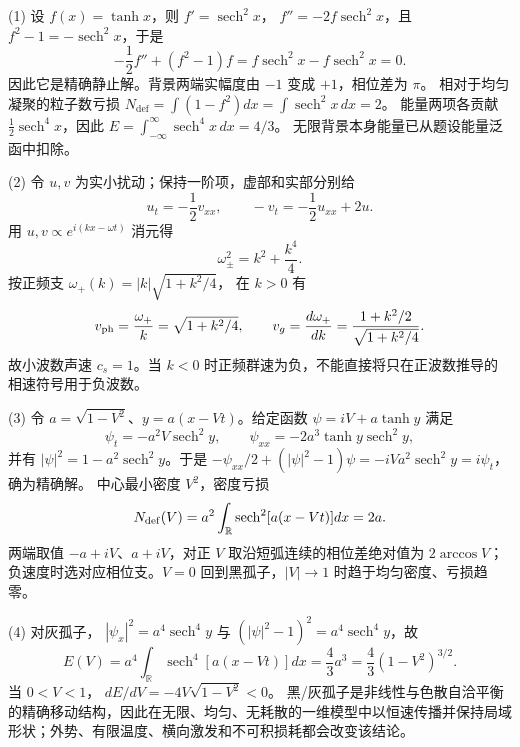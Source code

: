 (1) 设 \(f(x)=\tanh x\)，则
\(f'=\operatorname{sech}^2x\)，
\(f''=-2f\operatorname{sech}^2x\)，且 \(f^2-1=-\operatorname{sech}^2x\)，于是
\[
-\frac12f''+(f^2-1)f
=f\operatorname{sech}^2x-f\operatorname{sech}^2x=0.
\]
因此它是精确静止解。背景两端实幅度由 \(-1\) 变成 \(+1\)，相位差为 \(\pi\)。
相对于均匀凝聚的粒子数亏损
\(N_{\mathrm{def}}=\int(1-f^2)dx=\int\operatorname{sech}^2x\,dx=2\)。
能量两项各贡献 \(\frac12\operatorname{sech}^4x\)，因此
\(E=\int_{-\infty}^\infty\operatorname{sech}^4x\,dx=4/3\)。
无限背景本身能量已从题设能量泛函中扣除。

(2) 令 \(u,v\) 为实小扰动；保持一阶项，虚部和实部分别给
\[
u_t=-\frac12v_{xx},\qquad
-v_t=-\frac12u_{xx}+2u.
\]
用 \(u,v\propto e^{i(kx-\omega t)}\) 消元得
\[
\boxed{\omega_\pm^2=k^2+\frac{k^4}{4}.}
\]
按正频支 \(\omega_+(k)=|k|\sqrt{1+k^2/4}\)，
在 \(k>0\) 有
\[
v_{\rm ph}=\frac{\omega_+}k=\sqrt{1+k^2/4},\qquad
v_g=\frac{d\omega_+}{dk}=\frac{1+k^2/2}{\sqrt{1+k^2/4}}.
\]
故小波数声速 \(c_s=1\)。当 \(k<0\) 时正频群速为负，不能直接将只在正波数推导的相速符号用于负波数。

(3) 令 \(a=\sqrt{1-V^2}\)、\(y=a(x-Vt)\)。给定函数
\(\psi=iV+a\tanh y\) 满足
\[
\psi_t=-a^2V\operatorname{sech}^2y,\qquad
\psi_{xx}=-2a^3\tanh y\operatorname{sech}^2y,
\]
并有 \(|\psi|^2=1-a^2\operatorname{sech}^2y\)。于是
\(-\psi_{xx}/2+(|\psi|^2-1)\psi
=-iVa^2\operatorname{sech}^2y=i\psi_t\)，确为精确解。
中心最小密度 \(V^2\)，密度亏损
\[
N_{\rm def}(V)=a^2\int_{\mathbb R}\operatorname{sech}^2[a(x-Vt)]dx=2a.
\]
两端取值 \(-a+iV\)、\(a+iV\)，对正 \(V\) 取沿短弧连续的相位差绝对值为 \(2\arccos V\)；负速度时选对应相位支。\(V=0\) 回到黑孤子，\(|V|\to1\) 时趋于均匀密度、亏损趋零。

(4) 对灰孤子，
\(|\psi_x|^2=a^4\operatorname{sech}^4y\) 与
\((|\psi|^2-1)^2=a^4\operatorname{sech}^4y\)，故
\[
E(V)=a^4\int_{\mathbb R}\operatorname{sech}^4[a(x-Vt)]dx
=\frac43 a^3=\frac43(1-V^2)^{3/2}.
\]
当 \(0<V<1\)，
\(dE/dV=-4V\sqrt{1-V^2}<0\)。
黑/灰孤子是非线性与色散自洽平衡的精确移动结构，因此在无限、均匀、无耗散的一维模型中以恒速传播并保持局域形状；外势、有限温度、横向激发和不可积损耗都会改变该结论。
